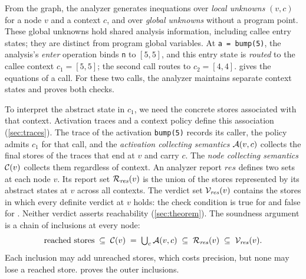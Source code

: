 From the graph, the analyzer generates inequations over \emph{local unknowns}
$(v, c)$ for a node $v$ and a context $c$, and over \emph{global unknowns}
without a program point. These global unknowns hold shared analysis
information, including callee entry states; they are distinct from program
global variables. At \texttt{a = bump(5)}, the analysis's \emph{enter}
operation binds \texttt{n} to $[5,5]$, and this entry state is \emph{routed}
to the callee context $c_1 = [5,5]$; the second call routes to
$c_2 = [4,4]$.  gives the equations of a call. For these
two calls, the analyzer maintains separate context states and proves both
checks.

To interpret the abstract state in $c_1$, we need the concrete stores
associated with that context. Activation traces and a context policy define
this association (\cref{sec:traces}). The trace of the activation
\texttt{bump(5)} records its caller, the policy admits $c_1$ for that call, and
the \emph{activation collecting
semantics} $\mathcal{A}(v, c)$ collects the final stores of the traces that end
at $v$ and carry $c$. The \emph{node collecting semantics} $\mathcal{C}(v)$
collects them regardless of context. An analyzer report $\mathit{res}$ defines
two sets at each node $v$. Its report set $\mathcal{R}_{\mathit{res}}(v)$ is the
union of the stores represented by its abstract states at $v$ across all
contexts. The verdict set $\mathcal{V}_{\mathit{res}}(v)$ contains the stores in which
every definite verdict at $v$ holds: the check condition is true for
 and false for . Neither verdict asserts
reachability (\cref{sec:theorem}). The soundness argument is a chain of
inclusions at every node:
\begin{equation}
\label{eq:chain}
\text{reached stores}
\;\subseteq\; \mathcal{C}(v)
\;=\; \textstyle\bigcup_c \mathcal{A}(v, c)
\;\subseteq\; \mathcal{R}_{\mathit{res}}(v)
\;\subseteq\; \mathcal{V}_{\mathit{res}}(v).
\end{equation}
Each inclusion may add unreached stores, which costs precision, but none may
lose a reached store.  proves the outer inclusions.
